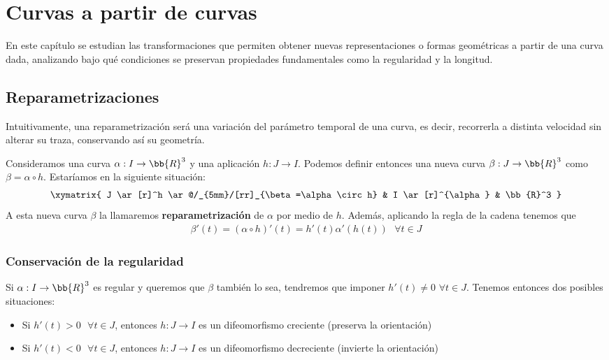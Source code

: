 \chapter{Curvas a partir de curvas}

En este capítulo se estudian las transformaciones que permiten obtener nuevas representaciones o formas geométricas a partir de una curva dada, analizando bajo qué condiciones se preservan propiedades fundamentales como la regularidad y la longitud.

\section{Reparametrizaciones}

Intuitivamente, una reparametrización será una variación del parámetro temporal de una curva, es decir, recorrerla a distinta velocidad sin alterar su traza, conservando así su geometría.

\begin{definicion}
    Consideramos una curva $\alpha:I \to \bb{R}^3$ y una aplicación $h:J\to I$. Podemos definir entonces una nueva curva $\beta:J \to \bb{R}^3$ como $\beta = \alpha\circ h$. Estaríamos en la siguiente situación:
    \begin{gather*}
        \xymatrix{
            J \ar[r]^h \ar@/_{5mm}/[rr]_{\beta=\alpha\circ h} & I \ar[r]^{\alpha} & \bb{R}^3
        }
    \end{gather*}
    A esta nueva curva $\beta$ la llamaremos \textbf{reparametrización} de $\alpha$ por medio de $h$. Además, aplicando la regla de la cadena tenemos que
    \begin{gather*}
        \beta'(t) = (\alpha \circ h)'(t) = h'(t)\alpha'(h(t))\ \ \ \forall t \in J
    \end{gather*}
\end{definicion}

\subsection{Conservación de la regularidad}

Si $\alpha:I\to \bb{R}^3$ es regular y queremos que $\beta$ también lo sea, tendremos que imponer $h'(t)\neq 0$ $\forall t \in J$. Tenemos entonces dos posibles situaciones:

\begin{itemize}
    \item Si $h'(t)>0\ \ \ \forall t \in J$, entonces $h:J\to I$ es un difeomorfismo creciente (preserva la orientación)
    \item Si $h'(t)<0\ \ \ \forall t \in J$, entonces $h:J\to I$ es un difeomorfismo decreciente (invierte la orientación)
\end{itemize}


